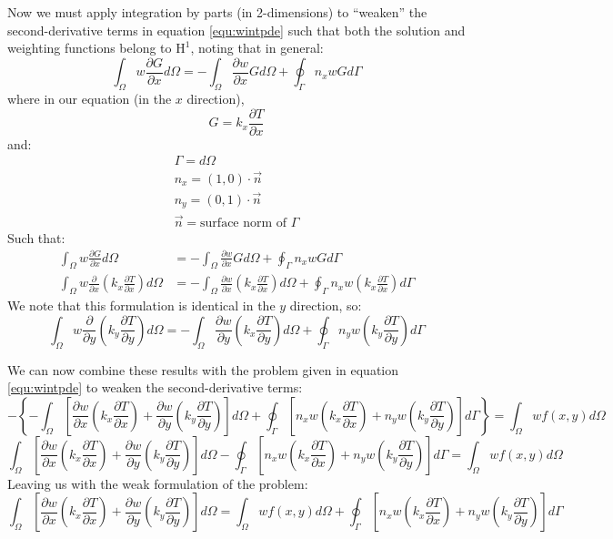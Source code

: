 \documentclass[letterpaper,10pt]{article}
\begin{document}
\noindent Now we must apply integration by parts (in 2-dimensions) to ``weaken'' the second-derivative terms in equation \ref{equ:wintpde} such that both the solution and weighting functions belong to $\mathrm{H}^1$, noting that in general:
\[\int_\Omega w \frac{\partial G}{\partial x}d\Omega = -\int_\Omega \frac{\partial w}{\partial x}Gd\Omega + \oint_\Gamma n_xwGd\Gamma\]
\noindent where in our equation (in the $x$ direction),
\[G = k_x\frac{\partial T}{\partial x}\]
\noindent and:
\[\begin{array}{l}
\Gamma = d\Omega \\
n_x = \left(1,0\right) \cdot \vec{n} \\
n_y = \left(0,1\right) \cdot \vec{n} \\
\vec{n} = \text{surface norm of } \Gamma
\end{array}\]
\noindent Such that:
\[\begin{split}
	\int_\Omega w \frac{\partial G}{\partial x}d\Omega &= -\int_\Omega \frac{\partial w}{\partial x}Gd\Omega + \oint_\Gamma n_xwGd\Gamma \\
	\int_\Omega w \frac{\partial}{\partial x}\left(k_x\frac{\partial T}{\partial x}\right)d\Omega &= -\int_\Omega \frac{\partial w}{\partial x}\left(k_x\frac{\partial T}{\partial x}\right)d\Omega + \oint_\Gamma n_xw\left(k_x\frac{\partial T}{\partial x}\right)d\Gamma
\end{split}\]
\noindent We note that this formulation is identical in the $y$ direction, so:
\[\int_\Omega w \frac{\partial}{\partial y}\left(k_y\frac{\partial T}{\partial y}\right)d\Omega = -\int_\Omega \frac{\partial w}{\partial y}\left(k_x\frac{\partial T}{\partial y}\right)d\Omega + \oint_\Gamma n_yw\left(k_y\frac{\partial T}{\partial y}\right)d\Gamma\]

\noindent We can now combine these results with the problem given in equation \ref{equ:wintpde} to weaken the second-derivative terms:
\[-\left\{-\int_\Omega \left[\frac{\partial w}{\partial x}\left(k_x\frac{\partial T}{\partial x}\right) + \frac{\partial w}{\partial y}\left(k_y\frac{\partial T}{\partial y}\right) \right]d\Omega + \oint_\Gamma \left[n_xw\left(k_x\frac{\partial T}{\partial x}\right) + n_yw\left(k_y\frac{\partial T}{\partial y}\right)\right]d\Gamma\right\} = \int_\Omega wf(x,y)d\Omega\]
\[\int_\Omega \left[\frac{\partial w}{\partial x}\left(k_x\frac{\partial T}{\partial x}\right) + \frac{\partial w}{\partial y}\left(k_y\frac{\partial T}{\partial y}\right) \right]d\Omega - \oint_\Gamma \left[n_xw\left(k_x\frac{\partial T}{\partial x}\right) + n_yw\left(k_y\frac{\partial T}{\partial y}\right)\right]d\Gamma = \int_\Omega wf(x,y)d\Omega\]
\noindent Leaving us with the weak formulation of the problem:
\begin{equation}
\label{equ:weak}
\boxed{\int_\Omega \left[\frac{\partial w}{\partial x}\left(k_x\frac{\partial T}{\partial x}\right) + \frac{\partial w}{\partial y}\left(k_y\frac{\partial T}{\partial y}\right) \right]d\Omega = \int_\Omega wf(x,y)d\Omega + \oint_\Gamma \left[n_xw\left(k_x\frac{\partial T}{\partial x}\right) + n_yw\left(k_y\frac{\partial T}{\partial y}\right)\right]d\Gamma}
\end{equation}
\end{document}
